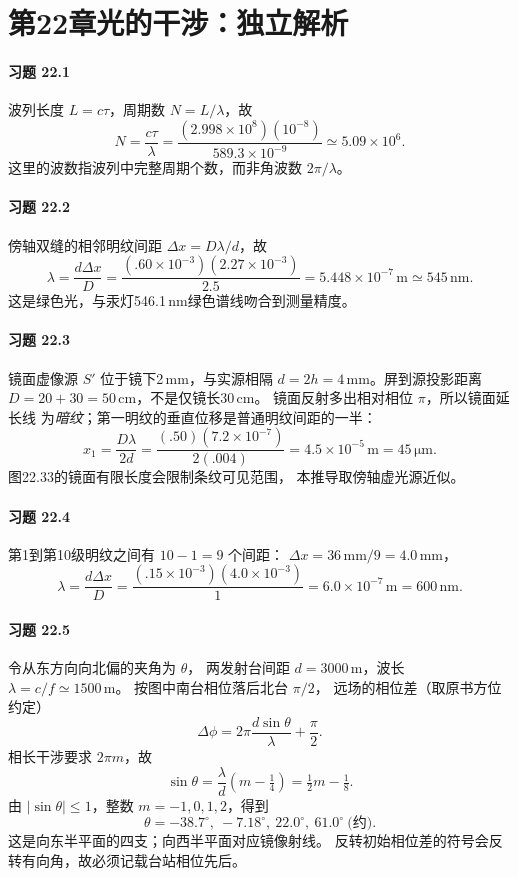 \section*{第22章\quad 光的干涉：独立解析}

\paragraph{习题 22.1}
波列长度 \(L=c\tau\)，周期数 \(N=L/\lambda\)，故
\[
\boxed{N=\frac{c\tau}{\lambda}
=\frac{(2.998\times10^8)(10^{-8})}{589.3\times10^{-9}}
\simeq5.09\times10^6}.
\]
这里的波数指波列中完整周期个数，而非角波数 \(2\pi/\lambda\)。

\paragraph{习题 22.2}
傍轴双缝的相邻明纹间距
\(\Delta x=D\lambda/d\)，故
\[
\boxed{\lambda=\frac{d\Delta x}{D}
=\frac{(.60\times10^{-3})(2.27\times10^{-3})}{2.5}
=5.448\times10^{-7}\,\mathrm m\simeq545\,\mathrm{nm}}.
\]
这是绿色光，与汞灯546.1\,nm绿色谱线吻合到测量精度。

\paragraph{习题 22.3}
镜面虚像源 \(S'\) 位于镜下2\,mm，与实源相隔
\(d=2h=4\,\mathrm{mm}\)。屏到源投影距离
\(D=20+30=50\,\mathrm{cm}\)，不是仅镜长30\,cm。
镜面反射多出相对相位 \(\pi\)，所以镜面延长线
为\emph{暗纹}；第一明纹的垂直位移是普通明纹间距的一半：
\[
\boxed{x_1=\frac{D\lambda}{2d}
=\frac{(.50)(7.2\times10^{-7})}{2(.004)}
=4.5\times10^{-5}\,\mathrm m=45\,\mathrm{\mu m}}.
\]
图22.33的镜面有限长度会限制条纹可见范围，
本推导取傍轴虚光源近似。

\paragraph{习题 22.4}
第1到第10级明纹之间有 \(10-1=9\) 个间距：
\(\Delta x=36\,\mathrm{mm}/9=4.0\,\mathrm{mm}\)，
\[
\boxed{\lambda=\frac{d\Delta x}D
=\frac{(.15\times10^{-3})(4.0\times10^{-3})}{1}
=6.0\times10^{-7}\,\mathrm m=600\,\mathrm{nm}}.
\]

\paragraph{习题 22.5}
令从东方向向北偏的夹角为 \(\theta\)，
两发射台间距 \(d=3000\,\mathrm m\)，波长
\(\lambda=c/f\simeq1500\,\mathrm m\)。
按图中南台相位落后北台 \(\pi/2\)，
远场的相位差（取原书方位约定）
\[
\Delta\phi=2\pi\frac{d\sin\theta}{\lambda}+\frac\pi2.
\]
相长干涉要求 \(2\pi m\)，故
\[
\sin\theta=\frac{\lambda}{d}(m-\tfrac14)
=\tfrac12m-\tfrac18.
\]
由 \(|\sin\theta|\le1\)，整数
\(m=-1,0,1,2\)，得到
\[
\boxed{\theta=-38.7^\circ,\ -7.18^\circ,\
22.0^\circ,\ 61.0^\circ\ \text{(约)}}.
\]
这是向东半平面的四支；向西半平面对应镜像射线。
反转初始相位差的符号会反转有向角，故必须记载台站相位先后。

